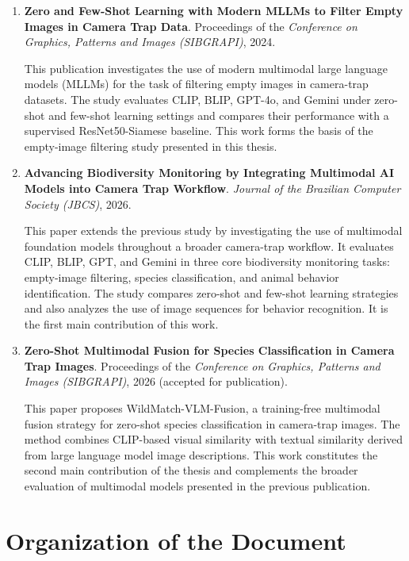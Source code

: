 \begin{enumerate}

\item \textbf{Zero and Few-Shot Learning with Modern MLLMs to Filter Empty Images in Camera Trap Data}. Proceedings of the \textit{Conference on Graphics, Patterns and Images (SIBGRAPI)}, 2024.

This publication investigates the use of modern multimodal large language models (MLLMs) for the task of filtering empty images in camera-trap datasets. The study evaluates CLIP, BLIP, GPT-4o, and Gemini under zero-shot and few-shot learning settings and compares their performance with a supervised ResNet50-Siamese baseline. This work forms the basis of the empty-image filtering study presented in this thesis.

\item \textbf{Advancing Biodiversity Monitoring by Integrating Multimodal AI Models into Camera Trap Workflow}. \textit{Journal of the Brazilian Computer Society (JBCS)}, 2026.

This paper extends the previous study by investigating the use of multimodal foundation models throughout a broader camera-trap workflow. It evaluates CLIP, BLIP, GPT, and Gemini in three core biodiversity monitoring tasks: empty-image filtering, species classification, and animal behavior identification. The study compares zero-shot and few-shot learning strategies and also analyzes the use of image sequences for behavior recognition. It is the first main  contribution of this work.

\item \textbf{Zero-Shot Multimodal Fusion for Species Classification in Camera Trap Images}. Proceedings of the \textit{Conference on Graphics, Patterns and Images (SIBGRAPI)}, 2026 (accepted for publication).

This paper proposes WildMatch-VLM-Fusion, a training-free multimodal fusion strategy for zero-shot species classification in camera-trap images. The method combines CLIP-based visual similarity with textual similarity derived from large language model image descriptions. This work constitutes the second main contribution of the thesis and complements the broader evaluation of multimodal models presented in the previous publication.

\end{enumerate}

\section{Organization of the Document}

